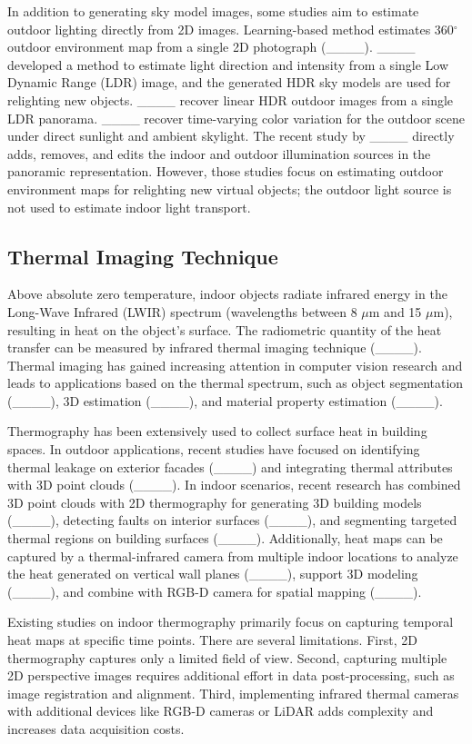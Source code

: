 In addition to generating sky model images, some studies aim to estimate outdoor lighting directly from 2D images. Learning-based method estimates 360$^{\circ}$ outdoor environment map from a single 2D photograph (____). ____ developed a method to estimate light direction and intensity from a single Low Dynamic Range (LDR) image, and the generated HDR sky models are used for relighting new objects. ____ recover linear HDR outdoor images from a single LDR panorama. ____ recover time-varying color variation for the outdoor scene under direct sunlight and ambient skylight. The recent study by ____ directly adds, removes, and edits the indoor and outdoor illumination sources in the panoramic representation. However, those studies focus on estimating outdoor environment maps for relighting new virtual objects; the outdoor light source is not used to estimate indoor light transport.

\subsection{Thermal Imaging Technique}
Above absolute zero temperature, indoor objects radiate infrared energy in the Long-Wave Infrared (LWIR) spectrum (wavelengths between 8 $\mu\text{m}$ and 15 $\mu\text{m}$), resulting in heat on the object's surface. The radiometric quantity of the heat transfer can be measured by infrared thermal imaging technique (____).  
Thermal imaging has gained increasing attention in computer vision research and leads to applications based on the thermal spectrum, such as object segmentation (____), 3D estimation (____), and material property estimation (____).

Thermography has been extensively used to collect surface heat in building spaces. In outdoor applications, recent studies have focused on identifying thermal leakage on exterior facades (____) and integrating thermal attributes with 3D point clouds (____). In indoor scenarios, recent research has combined 3D point clouds with 2D thermography for generating 3D building models (____), detecting faults on interior surfaces (____), and segmenting targeted thermal regions on building surfaces (____). Additionally, heat maps can be captured by a thermal-infrared camera from multiple indoor locations to analyze the heat generated on vertical wall planes (____), support 3D modeling (____), and combine with RGB-D camera for spatial mapping (____).
 
Existing studies on indoor thermography primarily focus on capturing temporal heat maps at specific time points. There are several limitations. First, 2D thermography captures only a limited field of view. Second, capturing multiple 2D perspective images requires additional effort in data post-processing, such as image registration and alignment. Third, implementing infrared thermal cameras with additional devices like RGB-D cameras or LiDAR adds complexity and increases data acquisition costs.